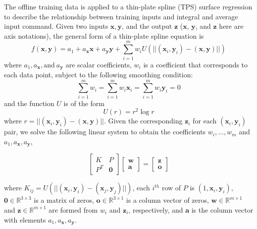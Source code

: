 \documentclass[letterpaper, 10 pt, conference]{ieeeconf}  %
\newcommand\NB[1]{$\spadesuit$\footnote{NB: #1}}
\begin{document}
The offline training data is applied to a thin-plate spline (TPS) \cite{TPS} surface regression to describe the relationship between training inputs and integral and average input command. Given two inputs $\mathbf{x},\mathbf{y}$, and the output $\mathbf{z}$ ($\mathbf{x}$, $\mathbf{y}$, and $\mathbf{z}$ here are axis notations), the general form of a thin-plate spline equation is 
\begin{equation}
    f(\mathbf{x},\mathbf{y}) = a_1 + a_{\mathbf{x}}\mathbf{x} + a_{\mathbf{y}}\mathbf{y} + \sum_{i=1}^mw_iU(||(\mathbf{x}_i,\mathbf{y}_i)-(\mathbf{x},\mathbf{y})||)
\end{equation}
where $a_1,a_{\mathbf{x}},\text{and}~a_{\mathbf{y}}$ are scalar coefficients, $w_i$ is a coefficient that corresponds to each data point, subject to the following smoothing condition: \begin{equation}
\sum_{i=1}^mw_i=\sum_{i=1}^mw_i\mathbf{x}_i=\sum_{i=1}^mw_i\mathbf{y}_i=0
\end{equation}
and the function $U$ is of the form
\begin{equation}
  U(r) = r^2\log{r} 
\end{equation}
where $r=||(\mathbf{x}_i,\mathbf{y}_i)-(\mathbf{x},\mathbf{y})||$.
Given the corresponding $\mathbf{z}_i$ for each $(\mathbf{x}_i,\mathbf{y}_i)$ pair, we solve the following linear system to obtain the coefficients $w_i,\ldots,w_m$ and $a_1,a_\mathbf{x},a_\mathbf{y}$,

\begin{equation}
    \begin{bmatrix}
    K&P\\
    P^T& \bm{0}
    \end{bmatrix}
    \begin{bmatrix}
    \bm{w}\\
    \bm{a}
    \end{bmatrix} = 
    \begin{bmatrix}
    \bm{z}\\
    \bm{o}
    \end{bmatrix}
\end{equation}

where $K_{ij} = U(||(\mathbf{x}_i,\mathbf{y}_i)-(\mathbf{x}_j,\mathbf{y}_j)||)$, each $i^{th}$ row of $P$ is $(1,\mathbf{x}_i,\mathbf{y}_i)$, $\bm{0}  \in \mathbb{R}^{3\times3}$ is a matrix of zeros, $\bm{o} \in \mathbb{R}^{3\times1}$ is a column vector of zeros, $\bm{w} \in \mathbb{R}^{m\times1}$ and $\bm{z} \in \mathbb{R}^{m\times1}$ are formed from $w_i$ and $\mathbf{z}_i$, respectively, and $\bm{a}$ is the column vector with elements $a_1,a_\mathbf{x},a_\mathbf{y}$.
\end{document}
